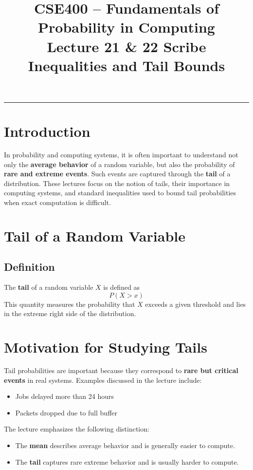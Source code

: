 \documentclass[12pt]{article}
\title{\textbf{CSE400 -- Fundamentals of Probability in Computing}\\
\Large Lecture 21 \& 22 Scribe\\
\large Inequalities and Tail Bounds}
\author{}
\date{}
\begin{document}
\maketitle
\vspace{-1.5em}
\hrule
\vspace{1em}

\section{Introduction}

In probability and computing systems, it is often important to understand not only the \textbf{average behavior} of a random variable, but also the probability of \textbf{rare and extreme events}. Such events are captured through the \textbf{tail} of a distribution. These lectures focus on the notion of tails, their importance in computing systems, and standard inequalities used to bound tail probabilities when exact computation is difficult.

\section{Tail of a Random Variable}

\subsection{Definition}
The \textbf{tail} of a random variable \(X\) is defined as
\[
P(X > x)
\]
This quantity measures the probability that \(X\) exceeds a given threshold and lies in the extreme right side of the distribution.

\section{Motivation for Studying Tails}

Tail probabilities are important because they correspond to \textbf{rare but critical events} in real systems. Examples discussed in the lecture include:
\begin{itemize}[leftmargin=1.5em]
    \item Jobs delayed more than 24 hours
    \item Packets dropped due to full buffer
\end{itemize}

The lecture emphasizes the following distinction:
\begin{itemize}[leftmargin=1.5em]
    \item The \textbf{mean} describes average behavior and is generally easier to compute.
    \item The \textbf{tail} captures rare extreme behavior and is usually harder to compute.
\end{itemize}
\end{document}

